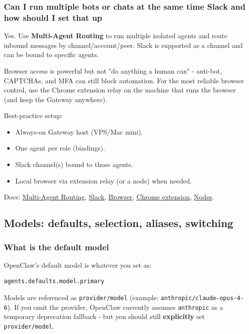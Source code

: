 \subsubsection{Can I run multiple bots or chats at the same time Slack and how should I set that up}


Yes. Use \textbf{Multi-Agent Routing} to run multiple isolated agents and route inbound messages by
channel/account/peer. Slack is supported as a channel and can be bound to specific agents.

Browser access is powerful but not "do anything a human can" - anti-bot, CAPTCHAs, and MFA can
still block automation. For the most reliable browser control, use the Chrome extension relay
on the machine that runs the browser (and keep the Gateway anywhere).

Best-practice setup:

\begin{itemize}
  \item Always-on Gateway host (VPS/Mac mini).
  \item One agent per role (bindings).
  \item Slack channel(s) bound to those agents.
  \item Local browser via extension relay (or a node) when needed.
\end{itemize}


Docs: \href{/concepts/multi-agent}{Multi-Agent Routing}, \href{/channels/slack}{Slack},
\href{/tools/browser}{Browser}, \href{/tools/chrome-extension}{Chrome extension}, \href{/nodes}{Nodes}.

\subsection{Models: defaults, selection, aliases, switching}


\subsubsection{What is the default model}


OpenClaw's default model is whatever you set as:

\begin{lstlisting}
agents.defaults.model.primary
\end{lstlisting}


Models are referenced as \texttt{provider/model} (example: \texttt{anthropic/claude-opus-4-6}). If you omit the provider, OpenClaw currently assumes \texttt{anthropic} as a temporary deprecation fallback - but you should still \textbf{explicitly} set \texttt{provider/model}.

